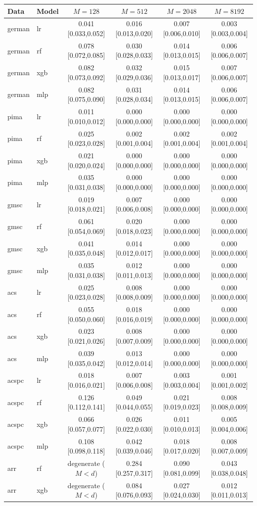 \begin{tabular}{llcccc}\toprule
Data & Model & $M{=}128$ & $M{=}512$ & $M{=}2048$ & $M{=}8192$\\\midrule
german & lr & 0.041 [0.033,0.052] & 0.016 [0.013,0.020] & 0.007 [0.006,0.010] & 0.003 [0.003,0.004]\\
german & rf & 0.078 [0.072,0.085] & 0.030 [0.028,0.033] & 0.014 [0.013,0.015] & 0.006 [0.006,0.007]\\
german & xgb & 0.082 [0.073,0.092] & 0.032 [0.029,0.036] & 0.015 [0.013,0.017] & 0.007 [0.006,0.007]\\
german & mlp & 0.082 [0.075,0.090] & 0.031 [0.028,0.034] & 0.014 [0.013,0.015] & 0.006 [0.006,0.007]\\
pima & lr & 0.011 [0.010,0.012] & 0.000 [0.000,0.000] & 0.000 [0.000,0.000] & 0.000 [0.000,0.000]\\
pima & rf & 0.025 [0.023,0.028] & 0.002 [0.001,0.004] & 0.002 [0.001,0.004] & 0.002 [0.001,0.004]\\
pima & xgb & 0.021 [0.020,0.024] & 0.000 [0.000,0.000] & 0.000 [0.000,0.000] & 0.000 [0.000,0.000]\\
pima & mlp & 0.035 [0.031,0.038] & 0.000 [0.000,0.000] & 0.000 [0.000,0.000] & 0.000 [0.000,0.000]\\
gmsc & lr & 0.019 [0.018,0.021] & 0.007 [0.006,0.008] & 0.000 [0.000,0.000] & 0.000 [0.000,0.000]\\
gmsc & rf & 0.061 [0.054,0.069] & 0.020 [0.018,0.023] & 0.000 [0.000,0.000] & 0.000 [0.000,0.000]\\
gmsc & xgb & 0.041 [0.035,0.048] & 0.014 [0.012,0.017] & 0.000 [0.000,0.000] & 0.000 [0.000,0.000]\\
gmsc & mlp & 0.035 [0.031,0.038] & 0.012 [0.011,0.013] & 0.000 [0.000,0.000] & 0.000 [0.000,0.000]\\
acs & lr & 0.025 [0.023,0.028] & 0.008 [0.008,0.009] & 0.000 [0.000,0.000] & 0.000 [0.000,0.000]\\
acs & rf & 0.055 [0.050,0.060] & 0.018 [0.016,0.019] & 0.000 [0.000,0.000] & 0.000 [0.000,0.000]\\
acs & xgb & 0.023 [0.021,0.026] & 0.008 [0.007,0.009] & 0.000 [0.000,0.000] & 0.000 [0.000,0.000]\\
acs & mlp & 0.039 [0.035,0.042] & 0.013 [0.012,0.014] & 0.000 [0.000,0.000] & 0.000 [0.000,0.000]\\
acspc & lr & 0.018 [0.016,0.021] & 0.007 [0.006,0.008] & 0.003 [0.003,0.004] & 0.001 [0.001,0.002]\\
acspc & rf & 0.126 [0.112,0.141] & 0.049 [0.044,0.055] & 0.021 [0.019,0.023] & 0.008 [0.008,0.009]\\
acspc & xgb & 0.066 [0.057,0.077] & 0.026 [0.022,0.030] & 0.011 [0.010,0.013] & 0.005 [0.004,0.006]\\
acspc & mlp & 0.108 [0.098,0.118] & 0.042 [0.039,0.046] & 0.018 [0.017,0.020] & 0.008 [0.007,0.009]\\
arr & rf & degenerate ($M{<}d$) & 0.284 [0.257,0.317] & 0.090 [0.081,0.099] & 0.043 [0.038,0.048]\\
arr & xgb & degenerate ($M{<}d$) & 0.084 [0.076,0.093] & 0.027 [0.024,0.030] & 0.012 [0.011,0.013]\\
\bottomrule\end{tabular}